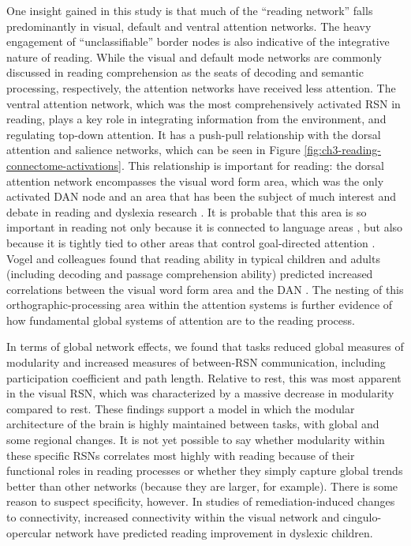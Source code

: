 One insight gained in this study is that much of the ``reading network'' falls predominantly in visual, default and ventral attention networks. The heavy engagement of ``unclassifiable'' border nodes is also indicative of the integrative nature of reading. While the visual and default mode networks are commonly discussed in reading comprehension as the seats of decoding and semantic processing, respectively, the attention networks have received less attention. The ventral attention network, which was the most comprehensively activated RSN in reading, plays a key role in integrating information from the environment, and regulating top-down attention. It has a push-pull relationship with the dorsal attention and salience networks, which can be seen in Figure \ref{fig:ch3-reading-connectome-activations}. This relationship is important for reading: the dorsal attention network encompasses the visual word form area, which was the only activated DAN node and an area that has been the subject of much interest and debate in reading and dyslexia research \citep{McCandliss2003}. It is probable that this area is so important in reading not only because it is connected to language areas \citep{Bouhali2014}, but also because it is tightly tied to other areas that control goal-directed attention \citep{Vogel2014}. Vogel and colleagues found that reading ability in typical children and adults (including decoding and passage comprehension ability) predicted increased correlations between the visual word form area and the DAN \citep{Vogel2012a}. The nesting of this orthographic-processing area within the attention systems is further evidence of how fundamental global systems of attention are to the reading process.

In terms of global network effects, we found that tasks reduced global measures of modularity and increased measures of between-RSN communication, including participation coefficient and path length. Relative to rest, this was most apparent in the visual RSN, which was characterized by a massive decrease in modularity compared to rest. These findings support a model in which the modular architecture of the brain is highly maintained between tasks, with global and some regional changes. It is not yet possible to say whether modularity within these specific RSNs correlates most highly with reading because of their functional roles in reading processes or whether they simply capture global trends better than other networks (because they are larger, for example). There is some reason to suspect specificity, however. In studies of remediation-induced changes to connectivity, increased connectivity within the visual network \citep{Koyama2013} and cingulo-opercular network \citep{HorowitzKraus2015} have predicted reading improvement in dyslexic children.

